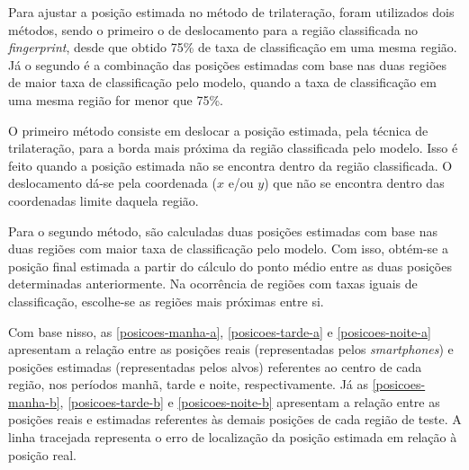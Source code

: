 \documentclass[12pt]{artigoifce}
\begin{document}
Para ajustar a posição estimada no método de trilateração, foram utilizados dois métodos, sendo o primeiro o de deslocamento para a região classificada no \textit{fingerprint}, desde que obtido 75\% de taxa de classificação em uma mesma região. Já o segundo é a combinação das posições estimadas com base nas duas regiões de maior taxa de classificação pelo modelo, quando a taxa de classificação em uma mesma região for menor que 75\%. 

O primeiro método consiste em deslocar a posição estimada, pela técnica de trilateração, para a borda mais próxima da região classificada pelo modelo. Isso é feito quando a posição estimada não se encontra dentro da região classificada. O deslocamento dá-se pela coordenada ($x$ e/ou $y$) que não se encontra dentro das coordenadas limite daquela região.

Para o segundo método, são calculadas duas posições estimadas com base nas duas regiões com maior taxa de classificação pelo modelo. Com isso, obtém-se a posição final estimada a partir do cálculo do ponto médio entre as duas posições determinadas anteriormente. Na ocorrência de regiões com taxas iguais de classificação, escolhe-se as regiões mais próximas entre si.

\renewcommand{\figureautorefname}{Figuras}%

Com base nisso, as \autoref{posicoes-manha-a}, \ref{posicoes-tarde-a} e \ref{posicoes-noite-a} apresentam a relação entre as posições reais (representadas pelos \textit{smartphones}) e posições estimadas (representadas pelos alvos) referentes ao centro de cada região, nos períodos manhã, tarde e noite, respectivamente. Já as \autoref{posicoes-manha-b}, \ref{posicoes-tarde-b} e \ref{posicoes-noite-b} apresentam a relação entre as posições reais e estimadas referentes às demais posições de cada região de teste. A linha tracejada representa o erro de localização da posição estimada em relação à posição real.
\end{document}
